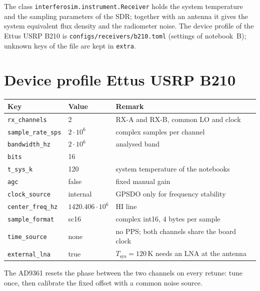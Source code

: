\label{ch:receiver}

The class \texttt{interferosim.instrument.Receiver} holds the system
temperature and the sampling parameters of the SDR; together with an
antenna it gives the system equivalent flux density and the radiometer
noise. The device profile of the Ettus USRP B210 is
\texttt{configs/receivers/b210.toml} (settings of notebook~B); unknown
keys of the file are kept in \texttt{extra}.

\section{Device profile Ettus USRP B210}

\begin{center}
\begin{tabular}{@{}ll>{\raggedright\arraybackslash}p{6.4cm}@{}}
\toprule
Key & Value & Remark \\
\midrule
\texttt{rx\_channels} & 2 & RX-A and RX-B, common LO and clock \\
\texttt{sample\_rate\_sps} & $2\cdot10^6$ & complex samples per channel \\
\texttt{bandwidth\_hz} & $2\cdot10^6$ & analysed band \\
\texttt{bits} & 16 & \\
\texttt{t\_sys\_k} & 120 & system temperature of the notebooks \\
\texttt{agc} & false & fixed manual gain \\
\texttt{clock\_source} & internal & GPSDO only for frequency stability \\
\texttt{center\_freq\_hz} & $1420.406\cdot10^6$ & HI line \\
\texttt{sample\_format} & sc16 & complex int16, 4 bytes per sample \\
\texttt{time\_source} & none & no PPS; both channels share the board clock \\
\texttt{external\_lna} & true & $T_\mathrm{sys} = 120\,\mathrm{K}$ needs an LNA at the antenna \\
\bottomrule
\end{tabular}
\end{center}
The AD9361 resets the phase between the two channels on every retune:
tune once, then calibrate the fixed offset with a common noise source.

